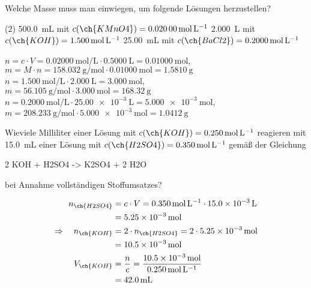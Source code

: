 \documentclass[DIV11,bib=totoc]{scrartcl}
\begin{document}
\begin{question}
Welche Masse muss man einwiegen, um folgende Lösungen herzustellen?
\begin{tasks}(2)
  \task \SI{500.0}{\milli\liter} mit $c(\ch{KMnO4}) = \SI{0.02000}{\mole\per\liter}$
  \task \SI{2.000}{\liter} mit $c(\ch{KOH}) = \SI{1.500}{\mole\per\liter}$
  \task \SI{25.00}{\milli\liter} mit $c(\ch{BaCl2}) = \SI{0.2000}{\mole\per\liter}$
\end{tasks}
\end{question}
\begin{solution}
\begin{tasks}
  \task $n = c\cdot V = \SI{0.02000}{\mole\per\liter}\cdot\SI{0.5000}{\liter}
    = \SI{0.01000}{\mole}$,\\
    $m = M\cdot n = \SI{158.032}{\gram\per\mole}\cdot\SI{0.01000}{\mole} =
    \SI{1.5810}{\gram}$
  \task $n = \SI{1.500}{\mole\per\liter}\cdot\SI{2.000}{\liter} =
    \SI{3.000}{\mole}$,\\
    $m = \SI{56.105}{\gram\per\mole}\cdot\SI{3.000}{\mole} =
    \SI{168.32}{\gram}$
  \task $n = \SI{0.2000}{\mole\per\liter}\cdot\SI{25.00e-3}{\liter} =
    \SI{5.000e-3}{\mole}$,\\
    $m = \SI{208.233}{\gram\per\mole}\cdot\SI{5.000e-3}{\mole} =
    \SI{1.0412}{\gram}$
\end{tasks}
\end{solution}

\begin{question}
Wieviele Milliliter einer Lösung mit $c(\ch{KOH}) =
\SI{0.250}{\mole\per\liter}$ reagieren mit \SI{15.0}{\milli\liter} einer
Lösung mit $c(\ch{H2SO4}) = \SI{0.350}{\mole\per\liter}$ gemäß der Gleichung
\begin{reaction*}
  2 KOH\aq{} + H2SO4\aq{} -> K2SO4\aq{} + 2 H2O\lqd{}
\end{reaction*}
bei Annahme vollständigen Stoffumsatzes?
\end{question}
\begin{solution}
\begin{align*}
  n_{\ch{H2SO4}}
    &= c\cdot V = \SI{0.350}{\mole\per\liter}\cdot\SI{15.0e-3}{\liter}\\
    &= \SI{5.25e-3}{\mole}\\
  \Rightarrow\quad n_{\ch{KOH}}
    &= 2\cdot n_{\ch{H2SO4}} = 2\cdot\SI{5.25e-3}{\mole}\\
    &= \SI{10.5e-3}{\mole}\\
  V_{\ch{KOH}}
    &= \frac{n}{c} = \frac{\SI{10.5e-3}{\mole}}{\SI{0.250}{\mole\per\liter}}\\
    &= \SI{42.0}{\milli\liter}
\end{align*}
\end{solution}
\end{document}
